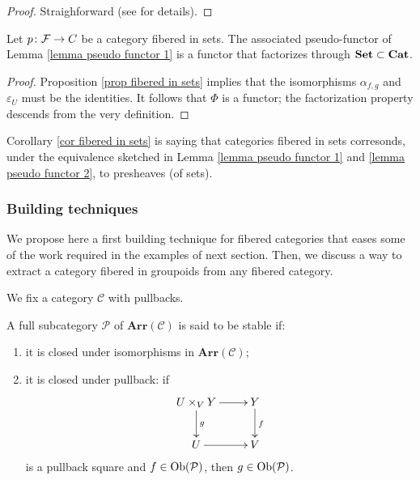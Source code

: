 \begin{refsection}
\begin{proof}
Straighforward (see \cite[Proposition 3.25]{vistoli} for details).
\end{proof}

\begin{cor} \label{cor fibered in sets}
Let $p \colon \mathcal F \to \mathcal \mathcal C$ be a category fibered in sets. The associated pseudo-functor of Lemma \ref{lemma pseudo functor 1} is a functor that factorizes through $\mathbf{Set} \subset \mathbf{Cat}$.
\end{cor}

\begin{proof}
Proposition \ref{prop fibered in sets} implies that the isomorphisms $\alpha_{f,g}$ and $\varepsilon_U$ must be the identities. It follows that $\Phi$ is a functor; the factorization property descends from the very definition.
\end{proof}

\begin{rmk} \label{rmk fibered in sets}
Corollary \ref{cor fibered in sets} is saying that categories fibered in sets corresonds, under the equivalence sketched in Lemma \ref{lemma pseudo functor 1} and \ref{lemma pseudo functor 2}, to presheaves (of sets).
\end{rmk}

\subsubsection{Building techniques}

We propose here a first building technique for fibered categories that eases some of the work required in the examples of next section. Then, we discuss a way to extract a category fibered in groupoids from any fibered category.

We fix a category $\mathcal C$ with pullbacks.

\begin{defin} \label{def stable arrows}
A full subcategory $\mathcal P$ of $\mathbf{Arr}(\mathcal C)$ is said to be stable if:
\begin{enumerate}
\item it is closed under isomorphisms in $\mathbf{Arr}(\mathcal C)$;
\item it is closed under pullback: if
\[
\xymatrix{
U \times_V Y \ar[r] \ar[d]^g & Y \ar[d]^f \\ U \ar[r] & V
}
\]
is a pullback square and $f \in \mathrm{Ob}(\mathcal P)$, then $g \in \mathrm{Ob}(\mathcal P)$.
\end{enumerate}
\end{defin}


\end{refsection}
